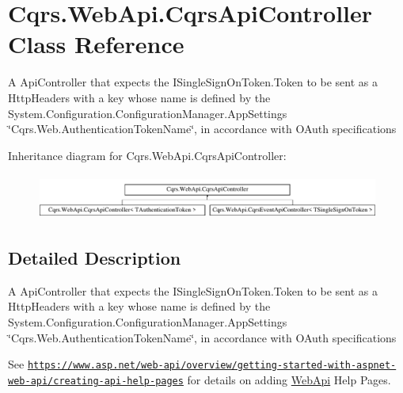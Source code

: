 \hypertarget{classCqrs_1_1WebApi_1_1CqrsApiController}{}\section{Cqrs.\+Web\+Api.\+Cqrs\+Api\+Controller Class Reference}
\label{classCqrs_1_1WebApi_1_1CqrsApiController}


A Api\+Controller that expects the I\+Single\+Sign\+On\+Token.\+Token to be sent as a Http\+Headers with a key whose name is defined by the System.\+Configuration.\+Configuration\+Manager.\+App\+Settings \char`\"{}\+Cqrs.\+Web.\+Authentication\+Token\+Name\char`\"{}, in accordance with O\+Auth specifications  


Inheritance diagram for Cqrs.\+Web\+Api.\+Cqrs\+Api\+Controller\+:\begin{figure}[H]
\begin{center}
\leavevmode
\includegraphics[height=1.501341cm]{classCqrs_1_1WebApi_1_1CqrsApiController}
\end{center}
\end{figure}


\subsection{Detailed Description}
A Api\+Controller that expects the I\+Single\+Sign\+On\+Token.\+Token to be sent as a Http\+Headers with a key whose name is defined by the System.\+Configuration.\+Configuration\+Manager.\+App\+Settings \char`\"{}\+Cqrs.\+Web.\+Authentication\+Token\+Name\char`\"{}, in accordance with O\+Auth specifications 

See \href{https://www.asp.net/web-api/overview/getting-started-with-aspnet-web-api/creating-api-help-pages}{\tt https\+://www.\+asp.\+net/web-\/api/overview/getting-\/started-\/with-\/aspnet-\/web-\/api/creating-\/api-\/help-\/pages} for details on adding \hyperlink{namespaceCqrs_1_1WebApi}{Web\+Api} Help Pages. 